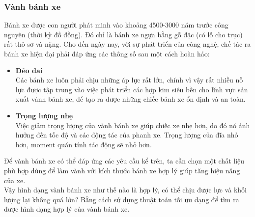 \documentclass[
12pt, %
oneside, %
english, %
onehalfspacing, %
nolistspacing, %
headsepline, %
addchap,
]{MastersDoctoralThesis} %
\begin{document}
\subsubsection*{Vành bánh xe}
Bánh xe được con người phát minh vào khoảng 4500-3000 năm trước công nguyên (thời kỳ đồ đồng). Đó chỉ là bánh xe ngựa bằng gỗ đặc (có lỗ cho trục) rất thô sơ và nặng. Cho đến ngày nay, với sự phát triển của công nghệ, chế tác ra bánh xe hiện đại phải đáp ứng các thông số sau một cách hoàn hảo:
\begin{itemize}
\item \textbf{Dẻo dai}\\
Các bánh xe luôn phải chịu những áp lực rất lớn, chính vì vậy rất nhiều nỗ lực được tập trung vào việc phát triển các hợp kim siêu bền cho lĩnh vực sản xuất vành bánh xe, để tạo ra được những chiếc bánh xe ổn định và an toàn.
\item \textbf{Trọng lượng nhẹ}\\
Việc giảm trọng lượng của vành bánh xe giúp chiếc xe nhẹ hơn, do đó nó ảnh hưởng đến tốc độ và các động tác của phanh xe. Trọng lượng của đĩa nhỏ hơn, moment quán tính tác động sẽ nhỏ hơn.
\end{itemize}
Để vành bánh xe có thể đáp ứng các yêu cầu kể trên, ta cần chọn một chất liệu phù hợp dùng để làm vành với kích thước bánh xe hợp lý giúp tăng hiệu năng của xe.\\
Vậy hình dạng vành bánh xe như thế nào là hợp lý, có thể chịu được lực và khối lượng lại không quá lớn? Bằng cách sử dụng thuật toán tối ưu dạng để tìm ra được hình dạng hợp lý của vành bánh xe.
\end{document}
